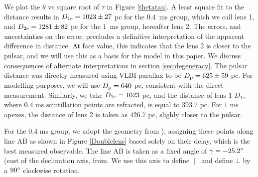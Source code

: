 \documentclass[useAMS,usenatbib]{mn2e}
\begin{document}
We plot the $\theta$ vs square root of $\tau$ in Figure
\ref{thetatau}. A least square fit to the distance results in
$D_{1{\rm e}}=1023\pm 27$ pc for the  $0.4$\ ms group, which we call lens 1, and
$D_{2{\rm e}} = 1281 \pm 82$ pc for the $1$\ ms group, hereafter lens 2.
The errors, and uncertainties on the error, precludes a definitive
interpretation of the apparent difference in distance.  At face value, 
this indicates that the lens 2 is closer to the pulsar, and we will
use this as a basis for the model in this paper.  We discuss
consequences of alternate interpretations in section \ref{sec:degeneracy}.
The pulsar distance was directly measured using VLBI parallax to be
$D_{\rm p} = 625 \pm 59$ pc.  For modelling purposes, we will use
$D_{\rm p} = 640$ pc, consistent with the direct measurement.  Similarly,
we take $D_{1{\rm e}}=1023$ pc,  and the distance of lens 1 $D_{1}$,
where $0.4$ ms scintillation points are refracted, is equal to $393.7$
pc. For $1$ ms apexes, the distance of lens 2 is taken as $426.7$ pc,
slighly closer to the pulsar.


For the 0.4 ms group, we adopt the geometry from
\citet{2010ApJ...708..232B}), assigning these points along line AB as
shown in Figure \ref{Doublelens} based solely on their delay, which is
the best measured observable. The line AB is taken as a
fixed angle of $\gamma=-25.2\degree$ (east of the
declination axis, from. We use this axis
to define ${\parallel}$ and define ${\bot}$ by a $90\degree$ clockwise
rotation.  
\end{document}
